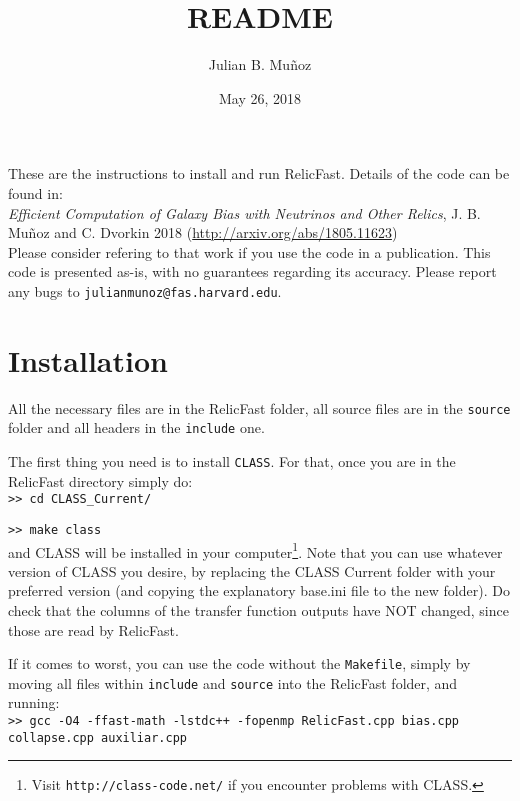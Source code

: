 \documentclass[prd, notitlepage, nofootinbib, 10pt]{revtex4-1}
\begin{document}
\title{README}
\author{Julian B. Mu\~noz}
\date{May 26, 2018} %
\maketitle

These are the instructions to install and run RelicFast. Details of the code can be found in: \\

\textit{Efficient Computation of Galaxy Bias with Neutrinos and Other Relics}, J. B. Mu\~noz and C. Dvorkin 2018 (\url{http://arxiv.org/abs/1805.11623}) \\

Please consider refering to that work if you use the code in a publication. This code is presented as-is, with no
guarantees regarding its accuracy. Please report any bugs to \texttt{julianmunoz@fas.harvard.edu}. 

\section{Installation}
All the necessary files are in the RelicFast folder, all source files are in the \texttt{source} folder and all headers in the \texttt{include} one. 

The first thing you need is to install \texttt{CLASS}. For that, once you are in the RelicFast directory simply do: \\

\texttt{>> cd CLASS\_Current/}

\texttt{>> make class} \\

and CLASS will be installed in your computer\footnote{Visit \texttt{http://class-code.net/} if you encounter problems with CLASS.}. Note that you can use whatever version of CLASS you desire, by replacing the CLASS Current folder with your preferred version (and copying the explanatory base.ini ﬁle to the new folder). Do check that the columns of the transfer function outputs have NOT changed, since those are read by RelicFast.

If it comes to worst, you can use the code without the \texttt{Makefile}, simply by moving all ﬁles within \texttt{include} and \texttt{source} into the RelicFast folder, and running: \\

\texttt{>> gcc -O4 -ffast-math -lstdc++ -fopenmp RelicFast.cpp bias.cpp collapse.cpp auxiliar.cpp}
\end{document}
